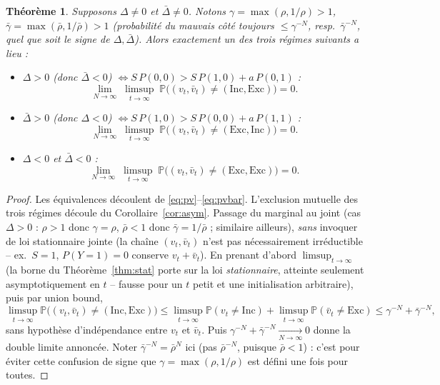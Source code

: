 \documentclass[12pt,a4paper]{article}
\newtheorem{theorem}{Théorème}
\newcommand{\Inc}{\ensuremath{\mathrm{Inc}}}
\newcommand{\Exc}{\ensuremath{\mathrm{Exc}}}
\newcommand{\vbar}{\bar{v}}
\begin{document}
\begin{theorem}\label{thm:sel}
Supposons $\Delta\ne0$ et $\bar\Delta\ne0$. Notons $\gamma=\max(\rho,1/\rho)>1$,
$\bar\gamma=\max(\bar\rho,1/\bar\rho)>1$ (probabilité du mauvais côté toujours
$\le\gamma^{-N}$, resp.\ $\bar\gamma^{-N}$, quel que soit le signe de
$\Delta,\bar\Delta$). Alors exactement un des trois régimes suivants a lieu :
\begin{itemize}
  \item $\Delta>0$ (donc $\bar\Delta<0$) $\iff S\,P(0,0)>S\,P(1,0)+a\,P(0,1)$ :
  \[
    \lim_{N\to\infty}\;\limsup_{t\to\infty}\;\mathbb P\bigl((v_t,\vbar_t)\ne(\Inc,\Exc)\bigr) = 0.
  \]
  \item $\bar\Delta>0$ (donc $\Delta<0$) $\iff S\,P(1,0)>S\,P(0,0)+a\,P(1,1)$ :
  \[
    \lim_{N\to\infty}\;\limsup_{t\to\infty}\;\mathbb P\bigl((v_t,\vbar_t)\ne(\Exc,\Inc)\bigr) = 0.
  \]
  \item $\Delta<0$ et $\bar\Delta<0$ :
  \[
    \lim_{N\to\infty}\;\limsup_{t\to\infty}\;\mathbb P\bigl((v_t,\vbar_t)\ne(\Exc,\Exc)\bigr) = 0.
  \]
\end{itemize}
\end{theorem}

\begin{proof}
Les équivalences découlent de \eqref{eq:pv}--\eqref{eq:pvbar}. L'exclusion
mutuelle des trois régimes découle du Corollaire~\ref{cor:asym}. Passage du
marginal au joint (cas $\Delta>0$ : $\rho>1$ donc $\gamma=\rho$, $\bar\rho<1$
donc $\bar\gamma=1/\bar\rho$ ; similaire ailleurs), \emph{sans} invoquer de loi
stationnaire jointe (la chaîne $(v_t,\vbar_t)$ n'est pas nécessairement
irréductible -- ex.\ $S{=}1$, $P(Y{=}1){=}0$ conserve $v_t+\vbar_t$). En
prenant d'abord $\limsup_{t\to\infty}$ (la borne du Théorème~\ref{thm:stat}
porte sur la loi \emph{stationnaire}, atteinte seulement asymptotiquement en
$t$ -- fausse pour un $t$ petit et une initialisation arbitraire), puis par
union bound,
\[
  \limsup_{t\to\infty}\mathbb P\bigl((v_t,\vbar_t)\ne(\Inc,\Exc)\bigr)
  \le \limsup_{t\to\infty}\mathbb P(v_t\ne\Inc)+\limsup_{t\to\infty}\mathbb P(\vbar_t\ne\Exc)
  \le \gamma^{-N}+\bar\gamma^{-N},
\]
sans hypothèse d'indépendance entre $v_t$ et $\vbar_t$. Puis
$\gamma^{-N}+\bar\gamma^{-N}\xrightarrow[N\to\infty]{}0$ donne la double
limite annoncée. Noter $\bar\gamma^{-N}=\bar\rho^N$ ici (pas $\bar\rho^{-N}$,
puisque $\bar\rho<1$) : c'est pour éviter cette confusion de signe que
$\gamma=\max(\rho,1/\rho)$ est défini une fois pour toutes.
\end{proof}
\end{document}
